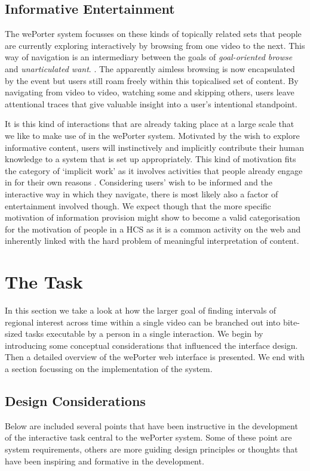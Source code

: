 \subsection{Informative Entertainment}

The wePorter system focusses on these kinds of topically related sets that people are currently exploring interactively by browsing from one video to the next. This way of navigation is an intermediary between the goals of \textit{goal-oriented browse} and \textit{unarticulated want}. . The apparently aimless browsing is now encapsulated by the event but users still roam freely within this topicalised set of content. By navigating from video to video, watching some and skipping others, users leave attentional traces that give valuable insight into a user's intentional standpoint.

It is this kind of interactions that are already taking place at a large scale that we like to make use of in the wePorter system. Motivated by the wish to explore informative content, users will instinctively and implicitly contribute their human knowledge to a system that is set up appropriately. This kind of motivation fits the category of `implicit work' as it involves activities that people already engage in for their own reasons \cite{Quinn:2011us}. Considering users' wish to be informed and the interactive way in which they navigate, there is most likely also a factor of entertainment involved though. We expect though that the more specific motivation of information provision might show to become a valid categorisation for the motivation of people in a HCS as it is a common activity on the web and inherently linked with the hard problem of meaningful interpretation of content.

\section{The Task}
\label{sec:weporter_task}

In this section we take a look at how the larger goal of finding intervals of regional interest across time within a single video can be branched out into bite-sized tasks executable by a person in a single interaction. We begin by introducing some conceptual considerations that influenced the interface design. Then a detailed overview of the wePorter web interface is presented. We end with a  section focussing on the implementation of the system.

\subsection{Design Considerations}
Below are included several points that have been instructive in the development of the interactive task central to the wePorter system. Some of these point are system requirements, others are more guiding design principles or thoughts that have been inspiring and formative in the development.

